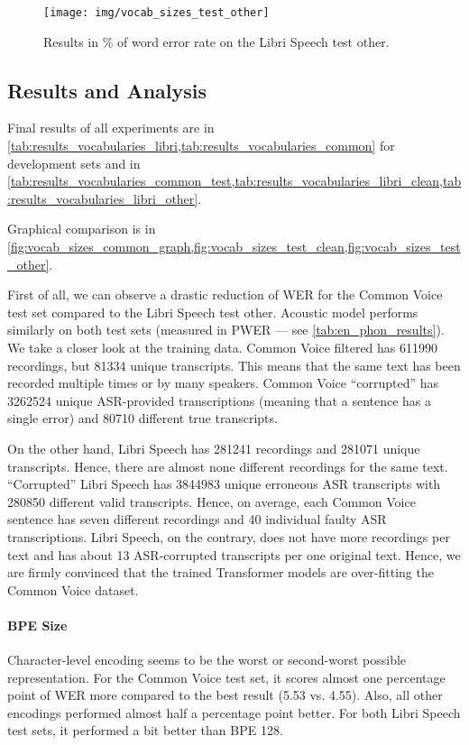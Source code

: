\begin{figure}[p]
	\centering
	\texttt{[image: img/vocab\_sizes\_test\_other]}
	\caption{Results in \% of word error rate on the Libri Speech test other.}
	\label{fig:vocab_sizes_test_other}
\end{figure}



\subsection{Results and Analysis}

Final results of all experiments are in \cref{tab:results_vocabularies_libri,tab:results_vocabularies_common} for development sets and in \cref{tab:results_vocabularies_common_test,tab:results_vocabularies_libri_clean,tab:results_vocabularies_libri_other}.

Graphical comparison is in \cref{fig:vocab_sizes_common_graph,fig:vocab_sizes_test_clean,fig:vocab_sizes_test_other}.

First of all, we can observe a drastic reduction of WER for the Common Voice test set compared to the Libri Speech test other. Acoustic model performs similarly on both test sets (measured in PWER --- see \cref{tab:en_phon_results}). We take a closer look at the training data. Common Voice filtered has 611990 recordings, but 81334 unique transcripts. This means that the same text has been recorded multiple times or by many speakers. Common Voice ``corrupted'' has 3262524 unique ASR-provided transcriptions (meaning that a sentence has a single error) and 80710 different true transcripts.

On the other hand, Libri Speech has 281241 recordings and 281071 unique transcripts. Hence, there are almost none different recordings for the same text. ``Corrupted'' Libri Speech has 3844983 unique erroneous ASR transcripts with 280850 different valid transcripts. Hence, on average, each Common Voice sentence has seven different recordings and 40 individual faulty ASR transcriptions. Libri Speech, on the contrary, does not have more recordings per text and has about 13 ASR-corrupted transcripts per one original text. Hence, we are firmly convinced that the trained Transformer models are over-fitting the Common Voice dataset.

\paragraph{BPE Size}
Character-level encoding seems to be the worst or second-worst possible representation. For the Common Voice test set, it scores almost one percentage point of WER more compared to the best result (5.53 vs. 4.55). Also, all other encodings performed almost half a percentage point better. For both Libri Speech test sets, it performed a bit better than BPE 128. 


